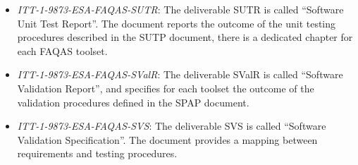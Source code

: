 \begin{itemize}
	\item \emph{ITT-1-9873-ESA-FAQAS-SUTR}: The deliverable SUTR is called ``Software Unit Test Report''. The document reports the outcome of the unit testing procedures described in the SUTP document, there is a dedicated chapter for each FAQAS toolset.

	\item \emph{ITT-1-9873-ESA-FAQAS-SValR}: The deliverable SValR is called ``Software Validation Report'', and specifies for each toolset the outcome of the validation procedures defined in the SPAP document.

	\item \emph{ITT-1-9873-ESA-FAQAS-SVS}: The deliverable SVS is called ``Software Validation Specification''. The document provides a mapping between requirements and testing procedures.
\end{itemize}



